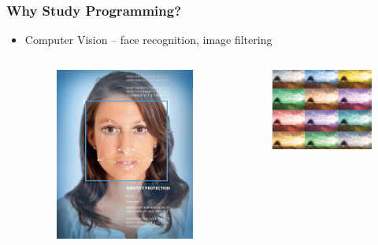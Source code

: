 \documentclass{beamer}
\begin{document}
\begin{frame}
    \frametitle{Why Study Programming?}
    \begin{itemize}
        \item Computer Vision -- face recognition, image filtering
        \begin{columns}
            \begin{figure}
                \centering
                \includegraphics[scale=0.47]{face_recog}
            \end{figure}
            \begin{figure}
                \centering
                \includegraphics[scale=0.26]{filtering}

\end{figure}
\end{columns}
\end{itemize}
\end{frame}
\end{document}
